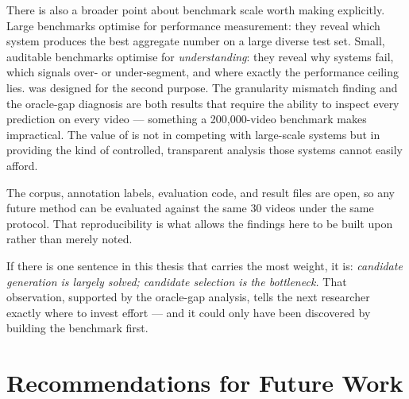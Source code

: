 There is also a broader point about benchmark scale worth making explicitly.
Large benchmarks optimise for performance measurement: they reveal which
system produces the best aggregate number on a large diverse test set.
Small, auditable benchmarks optimise for \emph{understanding}: they reveal
why systems fail, which signals over- or under-segment, and where exactly
the performance ceiling lies.
\dataset{} was designed for the second purpose.
The granularity mismatch finding and the oracle-gap diagnosis are both results
that require the ability to inspect every prediction on every video ---
something a 200,000-video benchmark makes impractical.
The value of \lecseg{} is not in competing with large-scale systems
but in providing the kind of controlled, transparent analysis those systems
cannot easily afford.

The \dataset{} corpus, annotation labels, evaluation code, and result files
are open, so any future method can be evaluated against the same 30 videos
under the same protocol.
That reproducibility is what allows the findings here to be built upon rather
than merely noted.

If there is one sentence in this thesis that carries the most weight, it is:
\emph{candidate generation is largely solved; candidate selection is the
bottleneck.}
That observation, supported by the oracle-gap analysis, tells the next
researcher exactly where to invest effort --- and it could only have been
discovered by building the benchmark first.

\section{Recommendations for Future Work}


